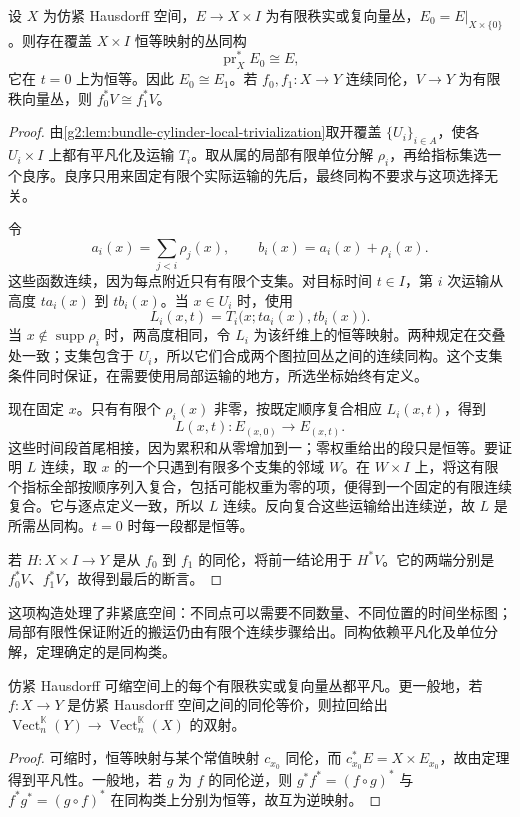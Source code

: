 \begin{theorem}\label{g2:thm:bundle-homotopy-invariance}
	设 \(X\) 为仿紧 Hausdorff 空间，\(E\to X\times I\) 为有限秩实或复向量丛，\(E_0=E|_{X\times\{0\}}\)。则存在覆盖 \(X\times I\) 恒等映射的丛同构
	\[
		\operatorname{pr}_X^*E_0\cong E,
	\]
	它在 \(t=0\) 上为恒等。因此 \(E_0\cong E_1\)。若 \(f_0,f_1:X\to Y\) 连续同伦，\(V\to Y\) 为有限秩向量丛，则 \(f_0^*V\cong f_1^*V\)。
\end{theorem}
\begin{proof}
	由\cref{g2:lem:bundle-cylinder-local-trivialization}取开覆盖 \(\{U_i\}_{i\in A}\)，使各 \(U_i\times I\) 上都有平凡化及运输 \(T_i\)。取从属的局部有限单位分解 \(\rho_i\)，再给指标集选一个良序。良序只用来固定有限个实际运输的先后，最终同构不要求与这项选择无关。

	令
	\[
		a_i(x)=\sum_{j<i}\rho_j(x),\qquad b_i(x)=a_i(x)+\rho_i(x).
	\]
	这些函数连续，因为每点附近只有有限个支集。对目标时间 \(t\in I\)，第 \(i\) 次运输从高度 \(t a_i(x)\) 到 \(t b_i(x)\)。当 \(x\in U_i\) 时，使用
	\[
		L_i(x,t)=T_i\bigl(x;t a_i(x),t b_i(x)\bigr).
	\]
	当 \(x\notin\operatorname{supp}\rho_i\) 时，两高度相同，令 \(L_i\) 为该纤维上的恒等映射。两种规定在交叠处一致；支集包含于 \(U_i\)，所以它们合成两个图拉回丛之间的连续同构。这个支集条件同时保证，在需要使用局部运输的地方，所选坐标始终有定义。

	现在固定 \(x\)。只有有限个 \(\rho_i(x)\) 非零，按既定顺序复合相应 \(L_i(x,t)\)，得到
	\[
		L(x,t):E_{(x,0)}\longrightarrow E_{(x,t)}.
	\]
	这些时间段首尾相接，因为累积和从零增加到一；零权重给出的段只是恒等。要证明 \(L\) 连续，取 \(x\) 的一个只遇到有限多个支集的邻域 \(W\)。在 \(W\times I\) 上，将这有限个指标全部按顺序列入复合，包括可能权重为零的项，便得到一个固定的有限连续复合。它与逐点定义一致，所以 \(L\) 连续。反向复合这些运输给出连续逆，故 \(L\) 是所需丛同构。\(t=0\) 时每一段都是恒等。

	若 \(H:X\times I\to Y\) 是从 \(f_0\) 到 \(f_1\) 的同伦，将前一结论用于 \(H^*V\)。它的两端分别是 \(f_0^*V\)、\(f_1^*V\)，故得到最后的断言。
\end{proof}

这项构造处理了非紧底空间：不同点可以需要不同数量、不同位置的时间坐标图；局部有限性保证附近的搬运仍由有限个连续步骤给出。同构依赖平凡化及单位分解，定理确定的是同构类。

\begin{corollary}\label{g2:cor:contractible-base-trivial-bundle}
	仿紧 Hausdorff 可缩空间上的每个有限秩实或复向量丛都平凡。更一般地，若 \(f:X\to Y\) 是仿紧 Hausdorff 空间之间的同伦等价，则拉回给出 \(\operatorname{Vect}_n^{\mathbb K}(Y)\to\operatorname{Vect}_n^{\mathbb K}(X)\) 的双射。
\end{corollary}
\begin{proof}
	可缩时，恒等映射与某个常值映射 \(c_{x_0}\) 同伦，而 \(c_{x_0}^*E=X\times E_{x_0}\)，故由定理得到平凡性。一般地，若 \(g\) 为 \(f\) 的同伦逆，则 \(g^*f^*=(f\circ g)^*\) 与 \(f^*g^*=(g\circ f)^*\) 在同构类上分别为恒等，故互为逆映射。
\end{proof}

